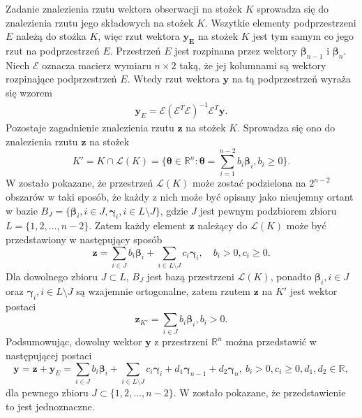 \documentclass[12pt]{mwart}
\begin{document}
Zadanie znalezienia rzutu wektora obserwacji na stożek $K$ sprowadza się do znalezienia rzutu jego składowych na stożek $K$. Wszytkie elementy podprzestrzeni $E$ należą do stożka $K$, więc rzut wektora $\mathbf{y_E}$ na stożek $K$ jest tym samym co jego rzut na podprzestrzeń $E$. Przestrzeń $E$ jest rozpinana przez wektory $\pmb{\beta}_{n-1}$ i $\pmb{\beta}_n$. Niech $\mathcal{E}$ oznacza macierz wymiaru $n\times 2$ taką, że jej kolumnami są wektory rozpinające podprzestrzeń $E$. Wtedy rzut wektora $\pmb{y}$ na tą podprzestrzeń wyraża się wzorem 
\begin{eqnarray}\label{rzut}
\mathbf{y}_E=\mathcal{E}(\mathcal{E}^T\mathcal{E})^{-1}\mathcal{E}^T\mathbf{y}.
\end{eqnarray}
Pozostaje zagadnienie znalezienia rzutu $\mathbf{z}$ na stożek $K$. Sprowadza się ono do znalezienia rzutu $\mathbf{z}$ na stożek 
\begin{displaymath}
K'=K\cap \mathcal{L}(K)=\{\pmb{\theta} \in \mathbb{R}^n\colon \pmb{\theta} =\sum_{i=1}^{n-2}{b_i\pmb{\beta}_i, b_i\geq 0}\}.
\end{displaymath}
W \cite{fraser} zostało pokazane, że przestrzeń $\mathcal{L}(K)$ może zostać podzielona na $2^{n-2}$ obszarów w taki sposób, że każdy z nich może być opisany jako nieujemny ortant w bazie $B_J=\{\pmb{\beta}_i, i\in J, \pmb{\gamma}_i,i\in L\setminus J\}$, gdzie $J$ jest pewnym podzbiorem zbioru $L=\{1,2,\dots,n-2\}$. Zatem każdy element $\pmb{z}$ należący do $\mathcal{L}(K)$ może być przedstawiony w następujący sposób
\begin{displaymath}
\pmb{z}=\sum_{i\in J}{b_i\pmb{\beta}_i}+\sum_{i\in L\setminus J}{c_i\pmb{\gamma}_i},\quad b_i>0,c_i\geq 0.
\end{displaymath}
Dla dowolnego zbioru $J\subset L$, $B_J$ jest bazą przestrzeni $\mathcal{L}(K)$, ponadto $\pmb{\beta}_i, i\in J$ oraz $\pmb{\gamma}_i,i\in L\setminus J$ są wzajemnie ortogonalne, zatem rzutem $\pmb{z}$ na $K'$ jest wektor postaci
\begin{displaymath}
\pmb{z}_{K'}=\sum_{i\in J}{b_i\pmb{\beta}_i}, b_i>0.
\end{displaymath}
Podsumowując, dowolny wektor $\mathbf{y}$ z przestrzeni $\mathbb{R}^n$ można przedstawić w następującej postaci
\begin{displaymath}
\mathbf{y}=\mathbf{z}+\mathbf{y}_E=\sum_{i\in J}{b_i\pmb{\beta}_i}+\sum_{i\in L\setminus J}{c_i\pmb{\gamma}_i}+d_1\pmb{\gamma}_{n-1}+d_2\pmb{\gamma}_n,\ b_i>0, c_i\geq 0, d_1,d_2\in \mathbb{R},
\end{displaymath}
dla pewnego zbioru $J\subset \{1,2,\dots,n-2\}$. W \cite{fraser} zostało pokazane, że przedstawienie to jest jednoznaczne.
\end{document}
